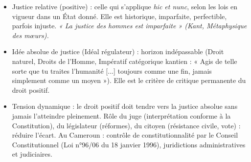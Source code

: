 \documentclass[11pt]{article}
\newcommand{\cle}[1]{{\popxbold\color{popdark}#1}}
\begin{document}
\begin{propriete}
\begin{itemize}
  \item \cle{Justice relative (positive)} : celle qui s'applique \emph{hic et nunc}, selon les lois en vigueur dans un État donné. Elle est historique, imparfaite, perfectible, parfois injuste. \textit{« La justice des hommes est imparfaite » (Kant, Métaphysique des mœurs).}
  \item \cle{Idée absolue de justice (Idéal régulateur)} : horizon indépassable (Droit naturel, Droits de l'Homme, Impératif catégorique kantien : « Agis de telle sorte que tu traites l'humanité [...] toujours comme une fin, jamais simplement comme un moyen »). Elle est le critère de critique permanente du droit positif.
  \item \cle{Tension dynamique} : le droit positif doit tendre vers la justice absolue sans jamais l'atteindre pleinement. Rôle du juge (interprétation conforme à la Constitution), du législateur (réformes), du citoyen (résistance civile, vote) : réduire l'écart. Au Cameroun : contrôle de constitutionnalité par le Conseil Constitutionnel (Loi n°96/06 du 18 janvier 1996), juridictions administratives et judiciaires.
\end{itemize}
\end{propriete}
\end{document}
